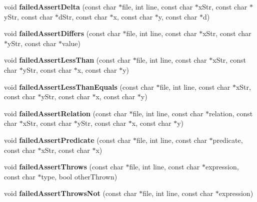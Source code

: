 \begin{DoxyCompactItemize}
\item 
\hypertarget{classCxxTest_1_1ErrorFormatter_ac2c9e5c1f2f2659f06c7e0278a0b09d4}{void {\bfseries failed\-Assert\-Delta} (const char $\ast$file, int line, const char $\ast$x\-Str, const char $\ast$y\-Str, const char $\ast$d\-Str, const char $\ast$x, const char $\ast$y, const char $\ast$d)}\label{classCxxTest_1_1ErrorFormatter_ac2c9e5c1f2f2659f06c7e0278a0b09d4}

\item 
\hypertarget{classCxxTest_1_1ErrorFormatter_a8585e1cf8de33bd34b6c0202fb3f8411}{void {\bfseries failed\-Assert\-Differs} (const char $\ast$file, int line, const char $\ast$x\-Str, const char $\ast$y\-Str, const char $\ast$value)}\label{classCxxTest_1_1ErrorFormatter_a8585e1cf8de33bd34b6c0202fb3f8411}

\item 
\hypertarget{classCxxTest_1_1ErrorFormatter_a4ddec838ef11d6c942e8ee1f33ad08f6}{void {\bfseries failed\-Assert\-Less\-Than} (const char $\ast$file, int line, const char $\ast$x\-Str, const char $\ast$y\-Str, const char $\ast$x, const char $\ast$y)}\label{classCxxTest_1_1ErrorFormatter_a4ddec838ef11d6c942e8ee1f33ad08f6}

\item 
\hypertarget{classCxxTest_1_1ErrorFormatter_adfd37ecffa09a201df1768fc221b0362}{void {\bfseries failed\-Assert\-Less\-Than\-Equals} (const char $\ast$file, int line, const char $\ast$x\-Str, const char $\ast$y\-Str, const char $\ast$x, const char $\ast$y)}\label{classCxxTest_1_1ErrorFormatter_adfd37ecffa09a201df1768fc221b0362}

\item 
\hypertarget{classCxxTest_1_1ErrorFormatter_abfef7a8b3eac0614b03b49bdef033664}{void {\bfseries failed\-Assert\-Relation} (const char $\ast$file, int line, const char $\ast$relation, const char $\ast$x\-Str, const char $\ast$y\-Str, const char $\ast$x, const char $\ast$y)}\label{classCxxTest_1_1ErrorFormatter_abfef7a8b3eac0614b03b49bdef033664}

\item 
\hypertarget{classCxxTest_1_1ErrorFormatter_a706809df99024eab185c98448826f705}{void {\bfseries failed\-Assert\-Predicate} (const char $\ast$file, int line, const char $\ast$predicate, const char $\ast$x\-Str, const char $\ast$x)}\label{classCxxTest_1_1ErrorFormatter_a706809df99024eab185c98448826f705}

\item 
\hypertarget{classCxxTest_1_1ErrorFormatter_a818e57b71d51887518c3b598498f613a}{void {\bfseries failed\-Assert\-Throws} (const char $\ast$file, int line, const char $\ast$expression, const char $\ast$type, bool other\-Thrown)}\label{classCxxTest_1_1ErrorFormatter_a818e57b71d51887518c3b598498f613a}

\item 
\hypertarget{classCxxTest_1_1ErrorFormatter_a1669f42b6cf8548c93ad0474fa64e4c1}{void {\bfseries failed\-Assert\-Throws\-Not} (const char $\ast$file, int line, const char $\ast$expression)}\label{classCxxTest_1_1ErrorFormatter_a1669f42b6cf8548c93ad0474fa64e4c1}

\end{DoxyCompactItemize}
